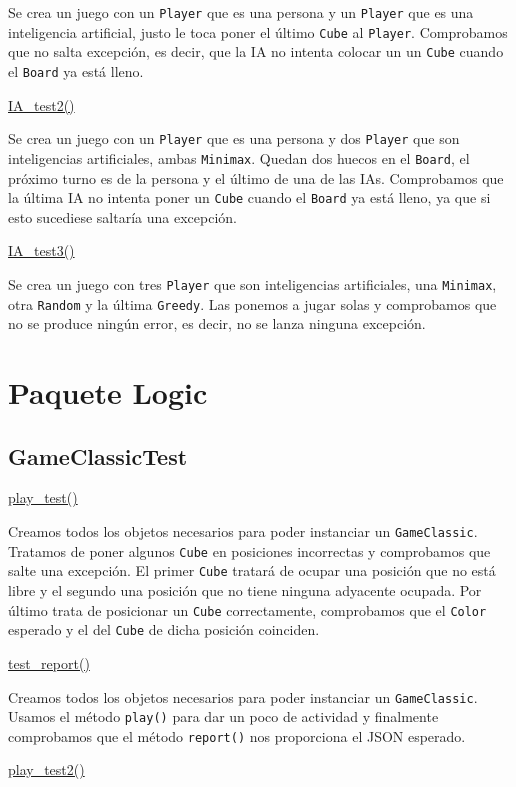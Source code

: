 \documentclass[12pt,a4paper,openright]{book}
\theoremstyle{break}
\begin{document}
Se crea un juego con un \texttt{Player} que es una persona y un \texttt{Player} que es una inteligencia artificial, justo le toca poner el último \texttt{Cube} al \texttt{Player}. Comprobamos que no salta excepción, es decir, que la IA no intenta colocar un un \texttt{Cube} cuando el \texttt{Board} ya está lleno.

\underline{IA\_test2()}

Se crea un juego con un \texttt{Player} que es una persona y dos \texttt{Player} que son inteligencias artificiales, ambas \texttt{Minimax}. Quedan dos huecos en el \texttt{Board}, el próximo turno es de la persona y el último de una de las IAs. Comprobamos que la última IA no intenta poner un \texttt{Cube} cuando el \texttt{Board} ya está lleno, ya que si esto sucediese saltaría una excepción.

\underline{IA\_test3()}

Se crea un juego con tres \texttt{Player} que son inteligencias artificiales, una \texttt{Minimax}, otra \texttt{Random} y la última \texttt{Greedy}. Las ponemos a jugar solas y comprobamos que no se produce ningún error, es decir, no se lanza ninguna excepción.

\section{Paquete Logic}
\subsection{GameClassicTest}
\underline{play\_test()}

Creamos todos los objetos necesarios para poder instanciar un \texttt{GameClassic}. Tratamos de poner algunos \texttt{Cube} en posiciones incorrectas y comprobamos que salte una excepción. El primer \texttt{Cube} tratará de ocupar una posición que no está libre y el segundo una posición que no tiene ninguna adyacente ocupada. Por último trata de posicionar un \texttt{Cube} correctamente, comprobamos que el \texttt{Color} esperado y el del \texttt{Cube} de dicha posición coinciden.

\underline{test\_report()}

Creamos todos los objetos necesarios para poder instanciar un \texttt{GameClassic}. Usamos el método \texttt{play()} para dar un poco de actividad y finalmente comprobamos que el método \texttt{report()} nos proporciona el JSON esperado.

\underline{play\_test2()}
\end{document}
